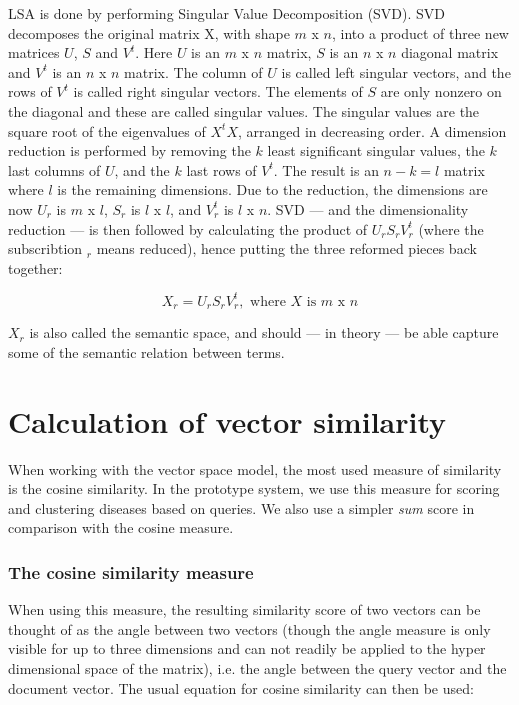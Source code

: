 LSA is done by performing Singular Value Decomposition (SVD). SVD
decomposes the original matrix X, with shape $\mathit{m}$ x
$\mathit{n}$, into a product of three new matrices $U$, $S$ and
$V^{t}$. Here $U$ is an $\mathit{m}$ x $\mathit{n}$ matrix, $S$ is an
$\mathit{n}$ x $\mathit{n}$ diagonal matrix and $V^{t}$ is an
$\mathit{n}$ x $\mathit{n}$ matrix. The column of $U$ is called left
singular vectors, and the rows of $V^{t}$ is called right singular
vectors. The elements of $S$ are only nonzero on the diagonal and
these are called singular values. The singular values are the square
root of the eigenvalues of $X^{t}X$, arranged in decreasing order. A
dimension reduction is performed by removing the $k$ least significant
singular values, the $k$ last columns of $U$, and the $k$ last rows of
$V^{t}$. The result is an $n - k = l$ matrix where $l$ is the
remaining dimensions. Due to the reduction, the dimensions are now
$U_{r}$ is $\mathit{m}$ x $\mathit{l}$, $S_{r}$ is $\mathit{l}$ x
$\mathit{l}$, and $V_{r}^{t}$ is $\mathit{l}$ x $\mathit{n}$. SVD ---
and the dimensionality reduction --- is then followed by calculating
the product of $U_{r}S_{r}V_{r}^{t}$ (where the subscribtion $_{r}$
means reduced), hence putting the three reformed pieces back together:

\[
X_{r} = U_{r}S_{r}V_{r}^{t}, \textrm{ where } X \textrm{ is } m \textrm{ x }n
\]

$X_{r}$ is also called the semantic space, and should --- in theory --- be
able capture some of the semantic relation between terms.

\section{Calculation of vector similarity\label{VectorSimilarity}}

When working with the vector space model, the most used measure of
similarity is the cosine similarity. In the prototype system, we use
this measure for scoring and clustering diseases based on queries. We
also use a simpler \textit{sum} score in comparison with the cosine
measure.

\subsubsection{The cosine similarity measure}
When using this measure, the resulting similarity score of two vectors
can be thought of as the angle between two vectors (though the angle
measure is only visible for up to three dimensions and can not readily
be applied to the hyper dimensional space of the matrix), i.e. the
angle between the query vector and the document vector. The usual
equation for cosine similarity can then be used:

